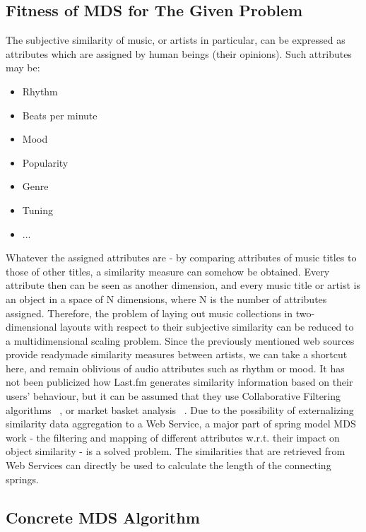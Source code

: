 \subsection{Fitness of MDS for The Given Problem}

The subjective similarity of music, or artists in particular, can be expressed as attributes which are assigned by human beings (their opinions). Such attributes may be:

\begin{itemize}
	\item Rhythm
	\item Beats per minute
	\item Mood
	\item Popularity
	\item Genre
	\item Tuning
	\item ...
\end{itemize}

Whatever the assigned attributes are - by comparing attributes of music titles to those of other titles, a similarity measure can somehow be obtained. Every attribute then can be seen as another dimension, and every music title or artist is an object in a space of N dimensions, where N is the number of attributes assigned.
Therefore, the problem of laying out music collections in two-dimensional layouts with respect to their subjective similarity can be reduced to a multidimensional scaling problem.
Since the previously mentioned web sources provide readymade similarity measures between artists, we can take a shortcut here, and remain oblivious of audio attributes such as rhythm or mood. It has not been publicized how Last.fm generates similarity information based on their users' behaviour, but it can be assumed that they use Collaborative Filtering algorithms ~\cite{Takacs:2007}, or market basket analysis ~\cite{Aggarwal99anew}. 
Due to the possibility of externalizing similarity data aggregation to a Web Service, a major part of spring model MDS work - the filtering and mapping of different attributes w.r.t. their impact on object similarity - is a solved problem. The similarities that are retrieved from Web Services can directly be used to calculate the length of the connecting springs.

\subsection{Concrete MDS Algorithm}


